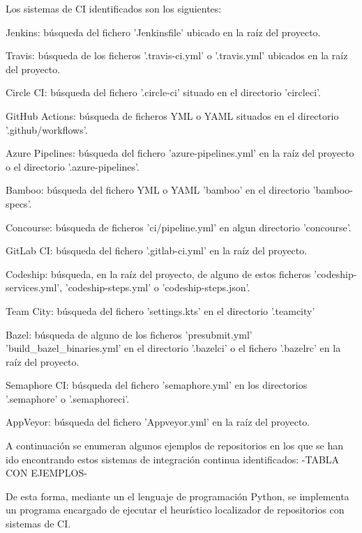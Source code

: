 Los sistemas de CI identificados son los siguientes:
\begin{compactitem}
    \item Jenkins: búsqueda del fichero 'Jenkinsfile' ubicado en la raíz del proyecto.
    \item Travis: búsqueda de los ficheros '.travis-ci.yml' o '.travis.yml' ubicados en la raíz del proyecto.
    \item Circle CI: búsqueda del fichero '.circle-ci' situado en el directorio 'circleci'.
    \item GitHub Actions: búsqueda de ficheros YML o YAML situados en el directorio '.github/workflows'.
    \item Azure Pipelines: búsqueda del fichero 'azure-pipelines.yml' en la raíz del proyecto o el directorio '.azure-pipelines'.
    \item Bamboo: búsqueda del fichero YML o YAML 'bamboo' en el directorio 'bamboo-specs'.
    \item Concourse: búsqueda de ficheros 'ci/pipeline.yml' en algun directorio 'concourse'.
    \item GitLab CI: búsqueda del fichero '.gitlab-ci.yml' en la raíz del proyecto.
    \item Codeship: búsqueda, en la raíz del proyecto, de alguno de estos ficheros 'codeship-services.yml', 'codeship-steps.yml' o 'codeship-steps.json'.
    \item Team City: búsqueda del fichero 'settings.kts' en el directorio '.teamcity'
    \item Bazel: búsqueda de alguno de los ficheros 'presubmit.yml' 'build\_bazel\_binaries.yml' en el directorio '.bazelci' o el fichero '.bazelrc' en la raíz del proyecto.
    \item Semaphore CI: búsqueda del fichero 'semaphore.yml' en los directorios '.semaphore' o '.semaphoreci'.
    \item AppVeyor: búsqueda del fichero 'Appveyor.yml' en la raíz del proyecto.
\end{compactitem}

A continuación se enumeran algunos ejemplos de repositorios en los que se han ido encontrando estos sistemas de integración continua identificados:
-TABLA CON EJEMPLOS-
	
De esta forma, mediante un el lenguaje de programación Python, se implementa un programa encargado de ejecutar el heurístico localizador de repositorios con sistemas de CI.

